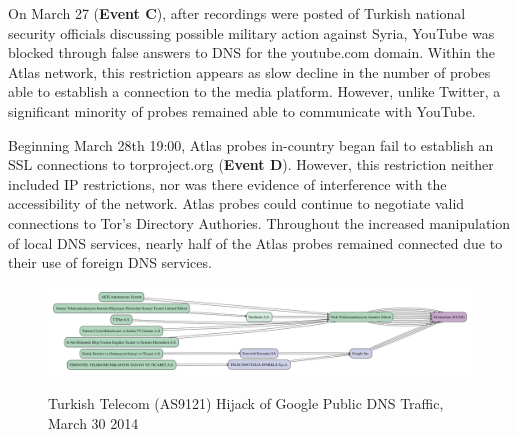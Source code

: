 On March 27 (\textbf{Event C}), after recordings were posted of Turkish
national security officials discussing possible military action against Syria,
YouTube was blocked through false answers to DNS for the youtube.com domain.
Within the Atlas network, this restriction appears as slow decline in the
number of probes able to establish a connection to the media platform. However, unlike Twitter, a
significant minority of probes remained able to communicate with YouTube.

Beginning
March 28th 19:00, Atlas probes in-country began fail to establish an SSL
connections to torproject.org (\textbf{Event D}). However, this restriction
neither included IP restrictions, nor was there evidence of interference with
the accessibility of the network. Atlas probes could continue to negotiate
valid connections to Tor's Directory Authories. Throughout the increased
manipulation of local DNS services, nearly half of the Atlas probes remained
connected due to their use of foreign DNS services.

\begin{figure}
  \includegraphics[width=\textwidth]{resources/traceroute-TR-google_public_dns-20140330-hijack.png}
  \label{image:tr-ttnet_hijack}
  \caption{Turkish Telecom (AS9121) Hijack of Google Public DNS Traffic, March 30 2014}
\end{figure}

